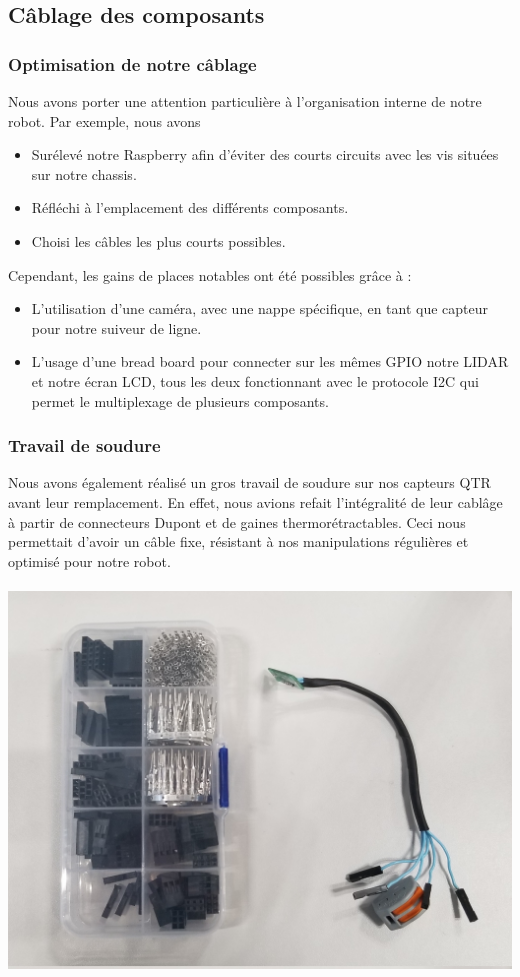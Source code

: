 \subsection{Câblage des composants}

\subsubsection*{Optimisation de notre câblage}
Nous avons porter une attention particulière à l'organisation interne de notre robot. Par exemple, nous avons 
\begin{itemize}
    \item Surélevé notre Raspberry afin d'éviter des courts circuits avec les vis situées sur notre chassis.
    \item Réfléchi à l'emplacement des différents composants.
    \item Choisi les câbles les plus courts possibles.
\end{itemize}
Cependant, les gains de places notables ont été possibles grâce à :
\begin{itemize}
    \item L'utilisation d'une caméra, avec une nappe spécifique, en tant que capteur pour notre suiveur de ligne.
    \item L'usage d'une bread board pour connecter sur les mêmes GPIO notre LIDAR et notre écran LCD, tous les deux fonctionnant avec le protocole I2C qui permet le multiplexage de plusieurs composants.
\end{itemize}

\subsubsection*{Travail de soudure}
Nous avons également réalisé un gros travail de soudure sur nos capteurs QTR avant leur remplacement. En effet, nous avions refait l'intégralité de leur cablâge à partir de connecteurs Dupont et de gaines thermorétractables. Ceci nous permettait d'avoir un câble fixe, résistant à nos manipulations régulières et optimisé pour notre robot.
\\
\\
\includegraphics[scale=0.09]{../images/capteurQTR.jpg}

